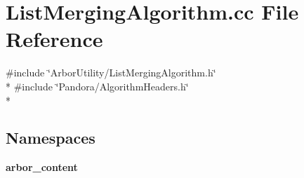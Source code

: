 \section{List\+Merging\+Algorithm.\+cc File Reference}
\label{ListMergingAlgorithm_8cc}
{\ttfamily \#include \char`\"{}Arbor\+Utility/\+List\+Merging\+Algorithm.\+h\char`\"{}}\\*
{\ttfamily \#include \char`\"{}Pandora/\+Algorithm\+Headers.\+h\char`\"{}}\\*
\subsection*{Namespaces}
\begin{DoxyCompactItemize}
\item 
 {\bf arbor\+\_\+content}
\end{DoxyCompactItemize}
